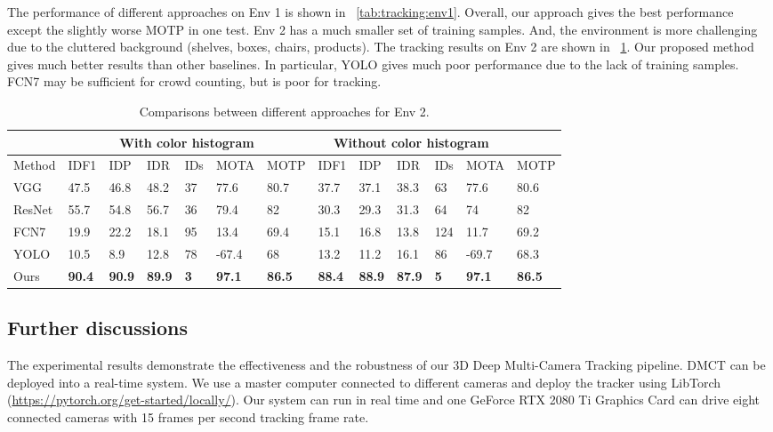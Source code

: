 \documentclass{article}
\begin{document}
The performance of different approaches on Env 1 is shown in \tablename{~\ref{tab:tracking:env1}}.
Overall, our approach gives the best performance except the slightly worse MOTP in one test.
Env 2 has a much smaller set of training samples. And, the environment is more challenging due to the cluttered background (shelves, boxes, chairs, products).
The tracking results on Env 2 are shown in \tablename{~\ref{tab:tracking:env2}}. 
Our proposed method gives much better results than other baselines.
In particular, YOLO gives much poor performance due to the lack of training samples. FCN7 may be sufficient for crowd counting, but is poor for tracking.
\begin{table}[!tbp]
	\begin{center}
		\caption{Comparisons between different approaches for Env 2. }
		\label{tab:tracking:env2}
		\begin{tabular}{l|p{0.4cm}p{0.4cm}p{0.4cm}p{0.2cm}p{0.6cm}p{0.8cm}|p{0.4cm}p{0.4cm}p{0.4cm}p{0.2cm}p{0.6cm}p{0.8cm}}
			\hline
			& \multicolumn{6}{c}{With color histogram} & \multicolumn{5}{|c}{Without color histogram}  \\ \hline
			Method &	IDF1 & IDP & IDR	&	IDs	&	MOTA&MOTP &IDF1&IDP &IDR	&	IDs	&	MOTA	&	MOTP	\\ \hline
			VGG	&47.5&46.8	&48.2 &	37	&	77.6	&	80.7 	& 37.7&37.1	& 38.3	&	63	&	77.6	&	80.6	\\
			ResNet  & 55.7&54.8	&56.7&	36	&	79.4	&	82	& 30.3 & 29.3&	31.3 	&	64	&	74	&	82	\\
			FCN7 & 19.9	& 22.2	&18.1&	95	&	13.4	&	69.4& 15.1 & 16.8	& 13.8	&	124	&	11.7	&	69.2	\\
			YOLO & 10.5	& 8.9	&12.8&	78	&	-67.4	&	68 & 13.2&11.2&	16.1&	86	&	-69.7	&	68.3	\\ \hline
			Ours &  \textbf{90.4}&\textbf{90.9}&	\textbf{89.9}&	\textbf{3}	&	\textbf{97.1}	&	\textbf{86.5}&\textbf{88.4}& \textbf{88.9}	& \textbf{87.9}&	\textbf{5}	&	\textbf{97.1}	&	\textbf{86.5}	\\
			\hline
		\end{tabular}
	\end{center}
\end{table}

\subsection{Further discussions}
The experimental results demonstrate the effectiveness and the robustness of our 3D Deep Multi-Camera Tracking pipeline.
DMCT can be deployed into a real-time system.
We use a master computer connected to different cameras and
deploy the tracker using LibTorch (\url{https://pytorch.org/get-started/locally/}).
Our system can run in real time and one GeForce RTX 2080 Ti Graphics Card can drive eight connected cameras with 15 frames per second 
tracking frame rate.
\end{document}
